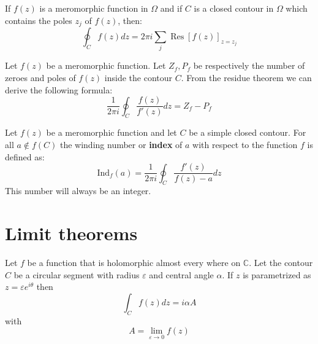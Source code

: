 	\begin{theorem}\label{complexcalculus:residue_theorem}
		If $f(z)$ is a meromorphic function in $\Omega$ and if $C$ is a closed contour in $\Omega$ which contains the poles $z_j$ of $f(z)$, then:
		\begin{equation}
                	\boxed{\oint_Cf(z)dz = 2\pi i\sum_j \operatorname{Res}\left[f(z)\right]_{z=z_j}}
		\end{equation}
	\end{theorem}
    
	\begin{formula}
		Let $f(z)$ be a meromorphic function. Let $Z_f, P_f$ be respectively the number of zeroes and poles of $f(z)$ inside the contour $C$. From the residue theorem we can derive the following formula:
		\begin{equation}
			\frac{1}{2\pi i}\oint_C\frac{f(z)}{f'(z)}dz = Z_f - P_f
		\end{equation}
	\end{formula}
	\begin{formula}
		Let $f(z)$ be a meromorphic function and let $C$ be a simple closed contour. For all $a\not\in f(C)$ the winding number or \textbf{index} of $a$ with respect to the function $f$ is defined as:
		\begin{equation}
			\text{Ind}_f(a) = \frac{1}{2\pi i}\oint_C\frac{f'(z)}{f(z) - a}dz
		\end{equation}
		This number will always be an integer.
	\end{formula}

\section{Limit theorems}

    	\begin{theorem}\label{complexcalculus:theorem:small_limit}
		Let $f$ be a function that is holomorphic almost every where on $\mathbb{C}$. Let the contour $C$ be a circular segment with radius $\varepsilon$ and central angle $\alpha$.
		If $z$ is parametrized as $z = \varepsilon e^{i\theta}$ then\[\int_Cf(z)dz = i\alpha A\] with \[A = \lim_{\varepsilon\rightarrow0}f(z)\]
	\end{theorem}
	
